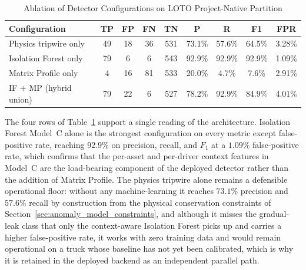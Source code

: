 \begin{table}[!htbp]
\centering
\caption{Ablation of Detector Configurations on LOTO Project-Native Partition}
\label{tab:ablation_detector_configs}
\small
\begin{tabular}{|p{}|c|c|c|c|c|c|c|c|}
\hline
\textbf{Configuration} & \textbf{TP} & \textbf{FP} & \textbf{FN} & \textbf{TN} & \textbf{P} & \textbf{R} & \textbf{F1} & \textbf{FPR} \\
\hline
Physics tripwire only          & 49 & 18 & 36 & 531 & 73.1\% & 57.6\% & 64.5\% & 3.28\% \\
\hline
Isolation Forest only          & 79 &  6 &  6 & 543 & 92.9\% & 92.9\% & 92.9\% & 1.09\% \\
\hline
Matrix Profile only            &  4 & 16 & 81 & 533 & 20.0\% &  4.7\% &  7.6\% & 2.91\% \\
\hline
IF $+$ MP (hybrid union)       & 79 & 22 &  6 & 527 & 78.2\% & 92.9\% & 84.9\% & 4.01\% \\
\hline
\end{tabular}
\end{table}

The four rows of Table~\ref{tab:ablation_detector_configs} support a single reading of the architecture. Isolation Forest Model~C alone is the strongest configuration on every metric except false-positive rate, reaching $92.9\%$ on precision, recall, and $F_1$ at a $1.09\%$ false-positive rate, which confirms that the per-asset and per-driver context features in Model~C are the load-bearing component of the deployed detector rather than the addition of Matrix Profile. The physics tripwire alone remains a defensible operational floor: without any machine-learning it reaches $73.1\%$ precision and $57.6\%$ recall by construction from the physical conservation constraints of Section~\ref{sec:anomaly_model_constraints}, and although it misses the gradual-leak class that only the context-aware Isolation Forest picks up and carries a higher false-positive rate, it works with zero training data and would remain operational on a truck whose baseline has not yet been calibrated, which is why it is retained in the deployed backend as an independent parallel path.

